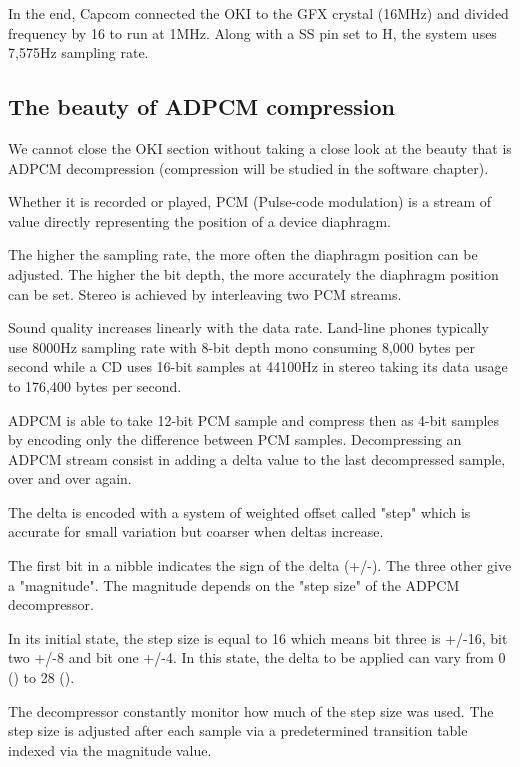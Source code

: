 In the end, Capcom connected the OKI to the GFX crystal (16MHz) and divided frequency by 16 to run at 1MHz. Along with a SS pin set to H, the system uses 7,575Hz sampling rate.




\subsection{The beauty of ADPCM compression} %
We cannot close the OKI section without taking a close look at the beauty that is ADPCM decompression (compression will be studied in the software chapter).

Whether it is recorded or played, PCM (Pulse-code modulation) is a stream of value directly representing the position of a device diaphragm.


The higher the sampling rate, the more often the diaphragm position can be adjusted. The higher the bit depth, the more accurately the diaphragm position can be set. Stereo is achieved by interleaving two PCM streams.

Sound quality increases linearly with the data rate. Land-line phones typically use 8000Hz sampling rate with 8-bit depth mono consuming 8,000 bytes per second while a CD uses 16-bit samples at 44100Hz in stereo taking its data usage to 176,400 bytes per second.
\pagebreak

ADPCM is able to take 12-bit PCM sample and compress then as 4-bit samples by encoding only the difference between PCM samples. Decompressing an ADPCM stream consist in adding a delta value to the last decompressed  sample, over and over again.

The delta is encoded with a system of weighted offset called "step" which is accurate for small variation but coarser when deltas increase. 

The first bit in a nibble indicates the sign of the delta (+/-). The three other give a "magnitude". The magnitude depends on the "step size" of the ADPCM decompressor.


In its initial state, the step size is equal to 16 which means bit three is +/-16, bit two +/-8 and bit one +/-4. In this state, the delta to be applied can vary from 0 () to 28 (). 

The decompressor constantly monitor how much of the step size was used. The step size is adjusted after each sample via a  predetermined transition table indexed via the magnitude value. 

